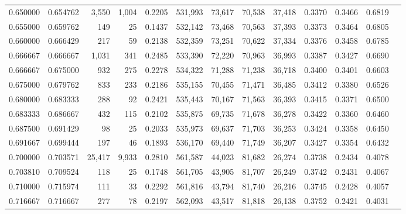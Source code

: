 \begin{tabular}{rrrrrrrrrrrrr}
0.650000 & 0.654762 &  3,550 &  1,004 &                                     0.2205 & 531,993 &  73,617 &  70,538 &  37,418 & 0.3370 & 0.3466 & 0.6819 \\
0.655000 & 0.659762 &    149 &     25 &                                     0.1437 & 532,142 &  73,468 &  70,563 &  37,393 & 0.3373 & 0.3464 & 0.6805 \\
0.660000 & 0.666429 &    217 &     59 &                                     0.2138 & 532,359 &  73,251 &  70,622 &  37,334 & 0.3376 & 0.3458 & 0.6785 \\
0.666667 & 0.666667 &  1,031 &    341 &                                     0.2485 & 533,390 &  72,220 &  70,963 &  36,993 & 0.3387 & 0.3427 & 0.6690 \\
0.666667 & 0.675000 &    932 &    275 &                                     0.2278 & 534,322 &  71,288 &  71,238 &  36,718 & 0.3400 & 0.3401 & 0.6603 \\
0.675000 & 0.679762 &    833 &    233 &                                     0.2186 & 535,155 &  70,455 &  71,471 &  36,485 & 0.3412 & 0.3380 & 0.6526 \\
0.680000 & 0.683333 &    288 &     92 &                                     0.2421 & 535,443 &  70,167 &  71,563 &  36,393 & 0.3415 & 0.3371 & 0.6500 \\
0.683333 & 0.686667 &    432 &    115 &                                     0.2102 & 535,875 &  69,735 &  71,678 &  36,278 & 0.3422 & 0.3360 & 0.6460 \\
0.687500 & 0.691429 &     98 &     25 &                                     0.2033 & 535,973 &  69,637 &  71,703 &  36,253 & 0.3424 & 0.3358 & 0.6450 \\
0.691667 & 0.699444 &    197 &     46 &                                     0.1893 & 536,170 &  69,440 &  71,749 &  36,207 & 0.3427 & 0.3354 & 0.6432 \\
0.700000 & 0.703571 & 25,417 &  9,933 &                                     0.2810 & 561,587 &  44,023 &  81,682 &  26,274 & 0.3738 & 0.2434 & 0.4078 \\
0.703810 & 0.709524 &    118 &     25 &                                     0.1748 & 561,705 &  43,905 &  81,707 &  26,249 & 0.3742 & 0.2431 & 0.4067 \\
0.710000 & 0.715974 &    111 &     33 &                                     0.2292 & 561,816 &  43,794 &  81,740 &  26,216 & 0.3745 & 0.2428 & 0.4057 \\
0.716667 & 0.716667 &    277 &     78 &                                     0.2197 & 562,093 &  43,517 &  81,818 &  26,138 & 0.3752 & 0.2421 & 0.4031 \\

\end{tabular}
